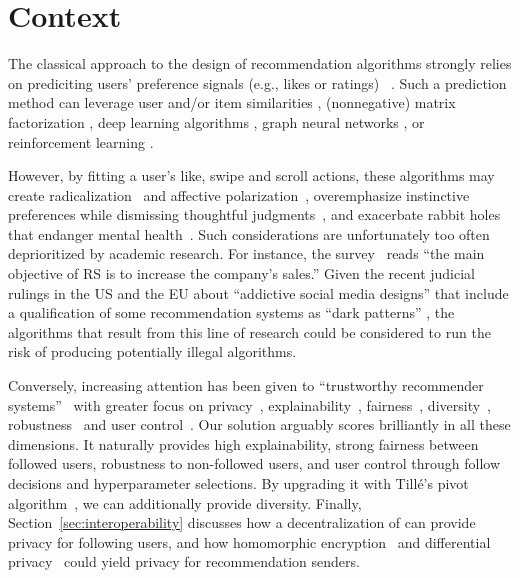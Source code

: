\section{Context}
\label{sec:context}

The classical approach to the design of recommendation algorithms
strongly relies on prediciting users' preference signals (e.g., likes or ratings)
~\cite{bobadilla2013recommender,DBLP:journals/csur/ZangerleB23,DBLP:journals/inffus/PanPCC26}.
Such a prediction method can leverage user and/or item similarities \cite{DBLP:journals/csur/SilvaMH24}, 
(nonnegative) matrix factorization \cite{DBLP:journals/tai/AhmadianBRFMJ25},
deep learning algorithms \cite{DBLP:conf/recsys/CovingtonAS16},
graph neural networks \cite{DBLP:journals/tors/GaoZLLQPQCJHL23},
or reinforcement learning \cite{DBLP:journals/csur/AfsarCF23}.

However, by fitting a user's like, swipe and scroll actions, 
these algorithms may create radicalization~\cite{gauthier2026political} 
and affective polarization~\cite{tornberg2022digital},
overemphasize instinctive preferences while dismissing thoughtful judgments~\cite{kahneman2011thinking},
and exacerbate rabbit holes that endanger mental health~\cite{ahmed2024social}.
Such considerations are unfortunately too often deprioritized by academic research.
For instance, the survey~\cite{DBLP:journals/ijon/AljunidHHASA25}
reads ``the main objective of RS is to increase the company's sales.''
Given the recent judicial rulings in the US and the EU about ``addictive social media designs''
that include a qualification of some recommendation systems as ``dark patterns'' 
\cite{eu-tiktok-preliminary,reuters-dutch-meta,instagram-youtube-landmark},
the algorithms that result from this line of research could be considered
to run the risk of producing potentially illegal algorithms.

Conversely, increasing attention has been given to 
``trustworthy recommender systems''~\cite{DBLP:journals/tors/GeLFTLXLXZ25}
with greater focus on privacy~\cite{DBLP:journals/ejis/LiU12}, 
explainability~\cite{DBLP:journals/ftir/ZhangC20}, 
fairness~\cite{DBLP:conf/sigir/DoU22,DBLP:journals/tois/WangM00M23}, 
diversity~\cite{wu2024result}, 
robustness~\cite{DBLP:journals/csur/ZhangCSWTSC26}
and user control~\cite{DBLP:journals/jiis/AtasFEPTU21}.
Our solution \Veche{} arguably scores brilliantly in all these dimensions.
It naturally provides high explainability, 
strong fairness between followed users,
robustness to non-followed users,
and user control through follow decisions and hyperparameter selections.
By upgrading it with Tillé's pivot algorithm~\CITE{}, 
we can additionally provide diversity.
Finally, Section~\ref{sec:interoperability} discusses 
how a decentralization of \Veche{} can provide privacy for following users,
and how homomorphic encryption~\cite{rivest1978data} 
and differential privacy~\cite{DBLP:conf/tamc/Dwork08}
could yield privacy for recommendation senders.

